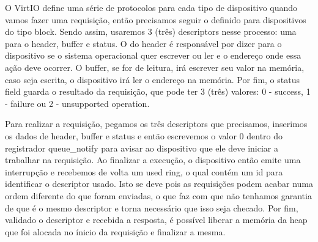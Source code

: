 O VirtIO define uma série de protocolos para cada tipo de dispositivo quando vamos fazer uma requisição, então precisamos seguir o definido para dispositivos do tipo block.
Sendo assim, usaremos 3 (três) descriptors nesse processo: uma para o header, buffer e status.
O do header é responsável por dizer para o dispositivo se o sistema operacional quer escrever ou ler e o endereço onde essa ação deve ocorrer.
O buffer, se for de leitura, irá escrever seu valor na memória, caso seja escrita, o dispositivo irá ler o endereço na memória.
Por fim, o status field guarda o resultado da requisição, que pode ter 3 (três) valores: 0 - success, 1 - failure ou 2 - unsupported operation.


Para realizar a requisição, pegamos os três descriptors que precisamos, inserimos os dados de header, buffer e status e então escrevemos o valor 0 dentro do registrador queue{\_}notify para avisar ao dispositivo que ele deve iniciar a trabalhar na requisição.
Ao finalizar a execução, o dispositivo então emite uma interrupção e recebemos de volta um used ring, o qual contém um id para identificar o descriptor usado. Isto se deve pois as requisições podem 
acabar numa ordem diferente do que foram enviadas, o que faz com que não tenhamos garantia de que é o mesmo descriptor e torna necessário que isso seja checado.
Por fim, validado o descriptor e recebida a resposta, é possível liberar a memória da heap que foi alocada no ínicio da requisição e finalizar a mesma.